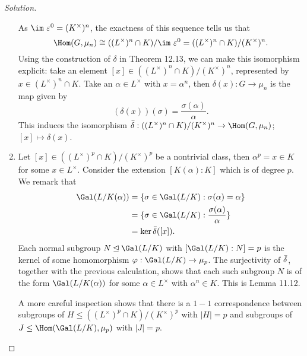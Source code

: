 \documentclass[a4paper,10pt,reqno]{amsart}
\newenvironment{sol}
  {\renewcommand\qedsymbol{$\blacksquare$}\begin{proof}[Solution]}
  {\end{proof}}
\begin{document}
\begin{sol}
\begin{enumerate}[label=(\roman*)]
    As $\im\ \varepsilon^0 = (K^{\times})^n$, the exactness of this sequence tells us that
    \[
    \Hom(G,\mu_n) \cong ((L^{\times})^n \cap K) / \im\ \varepsilon^0 = ((L^{\times})^n \cap K) / (K^{\times})^n.
    \]
    Using the construction of $\delta$ in Theorem 12.13, we can make this isomorphism explicit: take an element $[x] \in ((L^{\times})^n \cap K) / (K^{\times})^n$, represented by $x \in (L^{\times})^n \cap K$. Take an $\alpha \in L^{\times}$ with $x = \alpha^n$, then $\delta(x): G \to \mu_n$ is the map given by
    \[
    (\delta(x))(\sigma) = \frac{\sigma(\alpha)}{\alpha}.
    \]
    This induces the isomorphism $\Bar{\delta}: ((L^{\times})^n \cap K) / (K^{\times})^n \to \Hom(G,\mu_n)$; $[x] \mapsto \delta(x)$.

    \item Let $[x] \in ((L^{\times})^p \cap K) / (K^{\times})^p $ be a nontrivial class, then $\alpha^p = x \in K$ for some $x \in L^{\times}$. Consider the extension $[K(\alpha):K]$ which is of degree $p$. We remark that
    \begin{align*}
    \Gal(L/K(\alpha)) & = \{ \sigma \in \Gal(L/K): \sigma(\alpha) = \alpha \} \\
    & = \{ \sigma \in \Gal(L/K): \frac{\sigma(\alpha)}{\alpha} \} \\
    & = \ker \Bar{\delta}([x]).
    \end{align*}
    Each normal subgroup $N \unlhd \Gal(L/K)$ with $[\Gal(L/K):N] = p$ is the kernel of some homomorphism $\varphi: \Gal(L/K) \to \mu_p$. The surjectivity of $\Bar{\delta}$, together with the previous calculation, shows that each such subgroup $N$ is of the form $\Gal(L/K(\alpha))$ for some $\alpha \in L^{\times}$ with $\alpha^n \in K$. This is Lemma 11.12.

    A more careful inspection shows that there is a $1-1$ correspondence between subgroups of $H \leq ((L^{\times})^p \cap K) / (K^{\times})^p$ with $|H| = p$ and subgroups of $J \leq \Hom(\Gal(L/K),\mu_p)$ with $|J| = p$.\qedhere
    \end{enumerate}
\end{sol}
\end{document}
